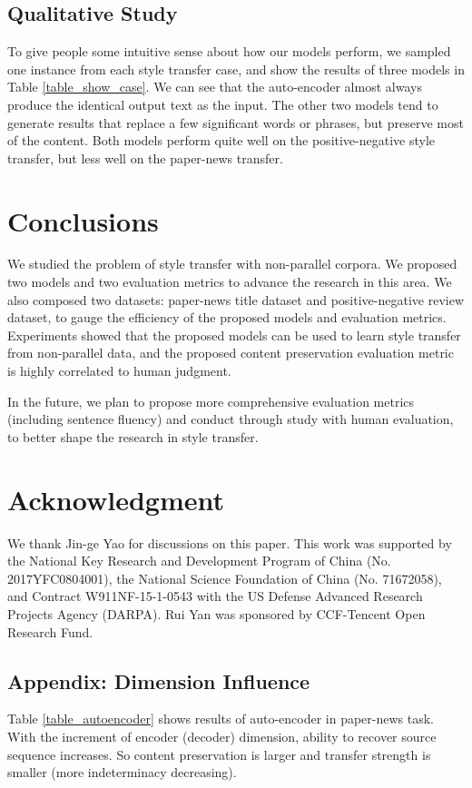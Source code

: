 \documentclass[letterpaper]{article} \usepackage{aaai18}  \usepackage{times}  \usepackage{helvet}  \usepackage{courier}  \usepackage{url}  \usepackage{graphicx}  \usepackage{amsmath}
\begin{document}
\subsection{Qualitative Study}
To give people some intuitive sense about how our models perform, we  sampled one instance from each style transfer case,  
and show the results of three models in Table \ref{table_show_case}. 
We can see that the auto-encoder almost always produce the identical output text as the input. 
The other two models tend to generate results that replace a few significant words or phrases,  
but preserve most of the content. 
Both models perform quite well on the positive-negative style transfer, but less well on the paper-news transfer.

\section{Conclusions}
We studied the problem of style transfer with non-parallel corpora. We proposed two models and 
two evaluation metrics to advance the research in this area. We also composed two datasets: paper-news title dataset  
and positive-negative review dataset, to gauge the efficiency of the proposed models and evaluation metrics. 
Experiments showed that the proposed models can be used to learn style transfer from non-parallel data, and the proposed 
content preservation evaluation metric is highly correlated to human judgment. 

In the future, we plan to propose more comprehensive evaluation metrics (including sentence fluency) and conduct through study with human evaluation, to better shape the research in style transfer.


\section{Acknowledgment}
We thank Jin-ge Yao for discussions on this paper. This work was supported by the National Key Research and Development Program of China (No. 2017YFC0804001), the National Science Foundation of China (No. 71672058), and Contract W911NF-15-1-0543 with the US Defense Advanced Research Projects Agency (DARPA). Rui Yan was sponsored by CCF-Tencent Open Research Fund.

 



\subsection{Appendix: Dimension Influence}
Table \ref{table_autoencoder} shows results of auto-encoder in paper-news task. With the increment of encoder (decoder) dimension, ability to recover source sequence increases. So content preservation is larger and transfer strength is smaller (more indeterminacy decreasing).
\end{document}
